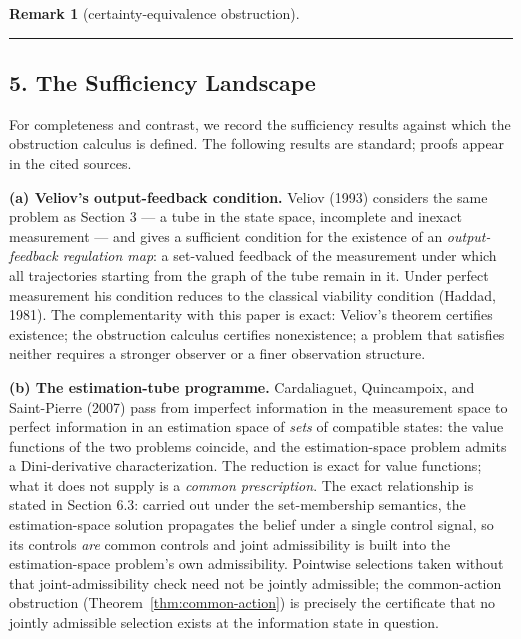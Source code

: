 \documentclass[11pt]{article}
\theoremstyle{definition}
\newtheorem{remark}{Remark}
\begin{document}
\begin{remark}[certainty-equivalence obstruction]
\end{remark}

\begin{center}\rule{0.5\linewidth}{0.5pt}\end{center}

\subsection{5. The Sufficiency Landscape}\label{the-sufficiency-landscape-cited}

For completeness and contrast, we record the sufficiency results against
which the obstruction calculus is defined. The following results are standard; proofs appear in the cited sources.

\textbf{(a) Veliov's output-feedback condition.} Veliov (1993) considers
the same problem as Section 3 --- a tube in the state space, incomplete
and inexact measurement --- and gives a sufficient condition for the
existence of an \emph{output-feedback regulation map}: a set-valued
feedback of the measurement under which all trajectories starting from
the graph of the tube remain in it. Under perfect measurement his
condition reduces to the classical viability condition (Haddad, 1981).
The complementarity with this paper is exact: Veliov's theorem certifies
existence; the obstruction calculus certifies nonexistence; a problem that satisfies neither requires a stronger observer or a finer observation structure.

\textbf{(b) The estimation-tube programme.} Cardaliaguet, Quincampoix,
and Saint-Pierre (2007) pass from imperfect information in the
measurement space to perfect information in an estimation space of
\emph{sets} of compatible states: the value functions of the two
problems coincide, and the estimation-space problem admits a
Dini-derivative characterization. The reduction is exact for value
functions; what it does not supply is a \emph{common prescription}. The exact relationship is stated in Section 6.3: carried out under the set-membership semantics, the estimation-space solution propagates the belief under a single control signal, so its controls \emph{are} common controls and joint admissibility is built into the estimation-space problem's own admissibility. Pointwise selections taken without that joint-admissibility check need not be jointly admissible; the common-action obstruction (Theorem~\ref{thm:common-action}) is precisely the certificate that no jointly admissible selection exists at the information state in question.
\end{document}
